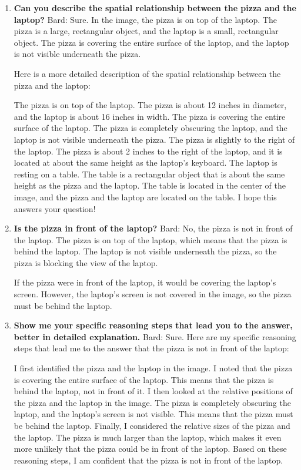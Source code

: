     \begin{enumerate}
        \item \textbf{Can you describe the spatial relationship between the pizza and the laptop?}
        \subitem Bard: 
        Sure. In the image, the pizza is on top of the laptop. The pizza is a large, rectangular object, and the laptop is a small, rectangular object. The pizza is covering the entire surface of the laptop, and the laptop is not visible underneath the pizza.

        Here is a more detailed description of the spatial relationship between the pizza and the laptop:

        The pizza is on top of the laptop. The pizza is about 12 inches in diameter, and the laptop is about 16 inches in width.
        The pizza is covering the entire surface of the laptop. The pizza is completely obscuring the laptop, and the laptop is not visible underneath the pizza.
        The pizza is slightly to the right of the laptop. The pizza is about 2 inches to the right of the laptop, and it is located at about the same height as the laptop's keyboard.
        The laptop is resting on a table. The table is a rectangular object that is about the same height as the pizza and the laptop. The table is located in the center of the image, and the pizza and the laptop are located on the table.
        I hope this answers your question!
        \item \textbf{Is the pizza in front of the laptop?}
        \subitem Bard: No, the pizza is not in front of the laptop. The pizza is on top of the laptop, which means that the pizza is behind the laptop. The laptop is not visible underneath the pizza, so the pizza is blocking the view of the laptop.

        If the pizza were in front of the laptop, it would be covering the laptop's screen. However, the laptop's screen is not covered in the image, so the pizza must be behind the laptop.
        \item \textbf{Show me your specific reasoning steps that lead you to the answer, better in detailed explanation.}
        \subitem Bard: 
        Sure. Here are my specific reasoning steps that lead me to the answer that the pizza is not in front of the laptop:

        I first identified the pizza and the laptop in the image.
        I noted that the pizza is covering the entire surface of the laptop. This means that the pizza is behind the laptop, not in front of it.
        I then looked at the relative positions of the pizza and the laptop in the image. The pizza is completely obscuring the laptop, and the laptop's screen is not visible. This means that the pizza must be behind the laptop.
        Finally, I considered the relative sizes of the pizza and the laptop. The pizza is much larger than the laptop, which makes it even more unlikely that the pizza could be in front of the laptop.
        Based on these reasoning steps, I am confident that the pizza is not in front of the laptop.


\end{enumerate}
